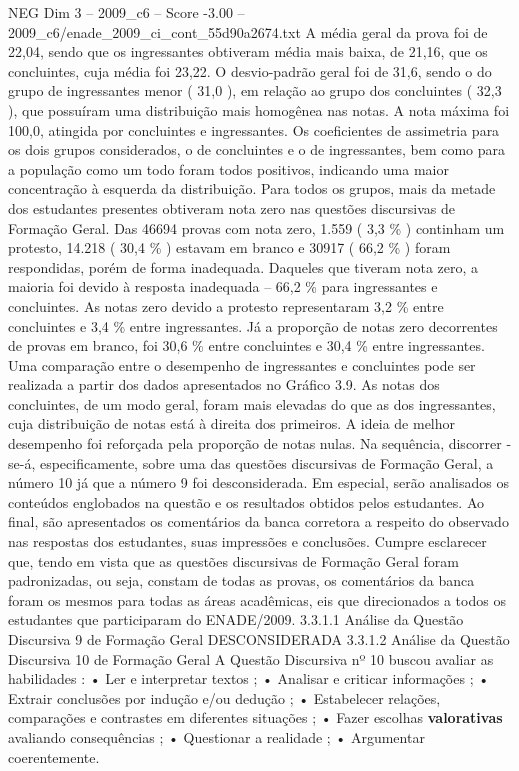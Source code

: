 \begin{textsample}{NEG Dim 3 – 2009\_c6 – Score -3.00 – 2009\_c6/enade\_2009\_ci\_cont\_55d90a2674.txt}
A média geral da prova foi de 22,04, sendo que os ingressantes obtiveram média mais baixa, de 21,16, que os concluintes, cuja média foi 23,22.
O desvio-padrão geral foi de 31,6, sendo o do grupo de ingressantes menor ( 31,0 ), em relação ao grupo dos concluintes ( 32,3 ), que possuíram uma distribuição mais homogênea nas notas.
A nota máxima foi 100,0, atingida por concluintes e ingressantes.
Os coeficientes de assimetria para os dois grupos considerados, o de concluintes e o de ingressantes, bem como para a população como um todo foram todos positivos, indicando uma maior concentração à esquerda da distribuição.
Para todos os grupos, mais da metade dos estudantes presentes obtiveram nota zero nas questões discursivas de Formação Geral.
Das 46694 provas com nota zero, 1.559 ( 3,3 \% ) continham um protesto, 14.218 ( 30,4 \% ) estavam em branco e 30917 ( 66,2 \% ) foram respondidas, porém de forma inadequada.
Daqueles que tiveram nota zero, a maioria foi devido à resposta inadequada – 66,2 \% para ingressantes e concluintes.
As notas zero devido a protesto representaram 3,2 \% entre concluintes e 3,4 \% entre ingressantes.
Já a proporção de notas zero decorrentes de provas em branco, foi 30,6 \% entre concluintes e 30,4 \% entre ingressantes.
Uma comparação entre o desempenho de ingressantes e concluintes pode ser realizada a partir dos dados apresentados no Gráfico 3.9.
As notas dos concluintes, de um modo geral, foram mais elevadas do que as dos ingressantes, cuja distribuição de notas está à direita dos primeiros.
A ideia de melhor desempenho foi reforçada pela proporção de notas nulas.
Na sequência, discorrer -se-á, especificamente, sobre uma das questões discursivas de Formação Geral, a número 10 já que a número 9 foi desconsiderada.
Em especial, serão analisados os conteúdos englobados na questão e os resultados obtidos pelos estudantes.
Ao final, são apresentados os comentários da banca corretora a respeito do observado nas respostas dos estudantes, suas impressões e conclusões.
Cumpre esclarecer que, tendo em vista que as questões discursivas de Formação Geral foram padronizadas, ou seja, constam de todas as provas, os comentários da banca foram os mesmos para todas as áreas acadêmicas, eis que direcionados a todos os estudantes que participaram do ENADE/2009. 3.3.1.1 Análise da Questão Discursiva 9 de Formação Geral DESCONSIDERADA 3.3.1.2 Análise da Questão Discursiva 10 de Formação Geral A Questão Discursiva nº 10 buscou avaliar as habilidades : • Ler e interpretar textos ; • Analisar e criticar informações ; • Extrair conclusões por indução e/ou dedução ; • Estabelecer relações, comparações e contrastes em diferentes situações ; • Fazer escolhas \textbf{valorativas} avaliando consequências ; • Questionar a realidade ; • Argumentar coerentemente.

\end{textsample}
